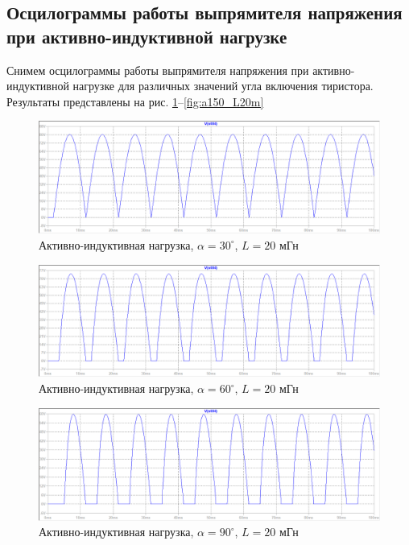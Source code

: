 \documentclass[a4paper, 12pt]{article}
\begin{document}
    \subsection{Осцилограммы работы выпрямителя напряжения при активно-индуктивной нагрузке}
    Снимем осцилограммы работы выпрямителя напряжения при активно-индуктивной нагрузке для различных значений
    угла включения тиристора. Результаты представлены на рис. \ref{fig:a30_L20m}--\ref{fig:a150_L20m}
    \begin{figure}[H]
        \centering
        \includegraphics[scale=0.45]{a30_L20m.png}
        \captionsetup{skip=0pt}
        \caption{Активно-индуктивная нагрузка, $\alpha=30^{\circ}$, $L=20$ мГн}
        \label{fig:a30_L20m}
    \end{figure}
    \begin{figure}[H]
        \centering
        \includegraphics[scale=0.45]{a60_L20m.png}
        \captionsetup{skip=0pt}
        \caption{Активно-индуктивная нагрузка, $\alpha=60^{\circ}$, $L=20$ мГн}
        \label{fig:a60_L20m}
    \end{figure}
    \begin{figure}[H]
        \centering
        \includegraphics[scale=0.45]{a90_L20m.png}
        \captionsetup{skip=0pt}
        \caption{Активно-индуктивная нагрузка, $\alpha=90^{\circ}$, $L=20$ мГн}
        \label{fig:a90_L20m}
    \end{figure}
\end{document}
